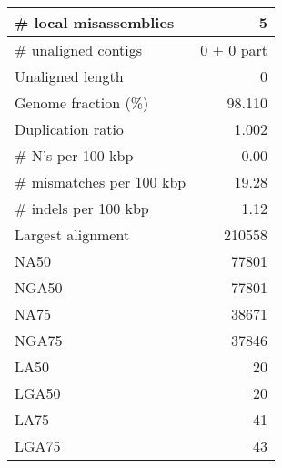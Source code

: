 \documentclass[12pt,a4paper]{article}
\begin{document}
\begin{table}[ht]
\begin{center}
\begin{tabular}{|l*{1}{|r}|}
\# local misassemblies & 5 \\ \hline
\# unaligned contigs & 0 + 0 part \\ \hline
Unaligned length & 0 \\ \hline
Genome fraction (\%) & 98.110 \\ \hline
Duplication ratio & 1.002 \\ \hline
\# N's per 100 kbp & 0.00 \\ \hline
\# mismatches per 100 kbp & 19.28 \\ \hline
\# indels per 100 kbp & 1.12 \\ \hline
Largest alignment & 210558 \\ \hline
NA50 & 77801 \\ \hline
NGA50 & 77801 \\ \hline
NA75 & 38671 \\ \hline
NGA75 & 37846 \\ \hline
LA50 & 20 \\ \hline
LGA50 & 20 \\ \hline
LA75 & 41 \\ \hline
LGA75 & 43 \\ \hline
\end{tabular}
\end{center}
\end{table}
\end{document}
